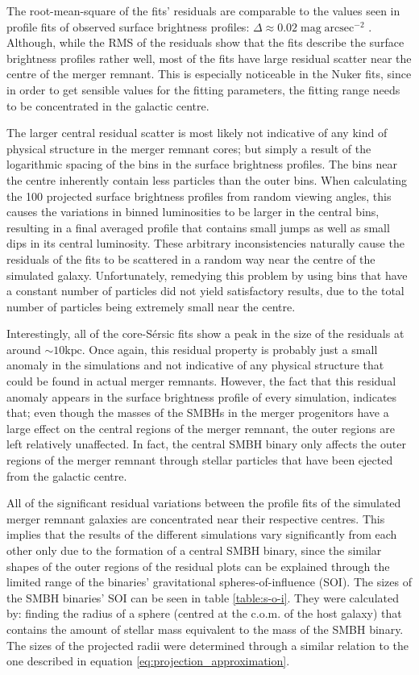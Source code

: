 \documentclass[english, oneside]{HYgradu}
\begin{document}
The root-mean-square of the fits' residuals are comparable to the values seen in profile fits of observed surface brightness profiles: $\Delta \approx 0.02 \; \mathrm{mag \; arcsec^{-2}}$ \citep{Dullo2012}. Although, while the RMS of the residuals show that the fits describe the surface brightness profiles rather well, most of the fits have large residual scatter near the centre of the merger remnant. This is especially noticeable in the Nuker fits, since in order to get sensible values for the fitting parameters, the fitting range needs to be concentrated in the galactic centre. 

The larger central residual scatter is most likely not indicative of any kind of physical structure in the merger remnant cores; but simply a result of the logarithmic spacing of the bins in the surface brightness profiles. The bins near the centre inherently contain less particles than the outer bins. When calculating the 100 projected surface brightness profiles from random viewing angles, this causes the variations in binned luminosities to be larger in the central bins, resulting in a final averaged profile that contains small jumps as well as small dips in its central luminosity. These arbitrary inconsistencies naturally cause the residuals of the fits to be scattered in a random way near the centre of the simulated galaxy. Unfortunately, remedying this problem by using bins that have a constant number of particles did not yield satisfactory results, due to the total number of particles being extremely small near the centre.

Interestingly, all of the core-Sérsic fits show a peak in the size of the residuals at around $\sim 10 \mathrm{kpc}$. Once again, this residual property is probably just a small anomaly in the simulations and not indicative of any physical structure that could be found in actual merger remnants. However, the fact that this residual anomaly appears in the surface brightness profile of every simulation, indicates that; even though the masses of the SMBHs in the merger progenitors have a large effect on the central regions of the merger remnant, the outer regions are left relatively unaffected. In fact, the central SMBH binary only affects the outer regions of the merger remnant through stellar particles that have been ejected from the galactic centre. 

All of the significant residual variations between the profile fits of the simulated merger remnant galaxies are concentrated near their respective centres. This implies that the results of the different simulations vary significantly from each other only due to the formation of a central SMBH binary, since the similar shapes of the outer regions of the residual plots can be explained through the limited range of the binaries' gravitational spheres-of-influence (SOI). The sizes of the SMBH binaries' SOI can be seen in table \ref{table:s-o-i}. They were calculated by: finding the radius of a sphere (centred at the c.o.m. of the host galaxy) that contains the amount of stellar mass equivalent to the mass of the SMBH binary. The sizes of the projected radii were determined through a similar relation to the one described in equation \ref{eq:projection_approximation}.
\end{document}
